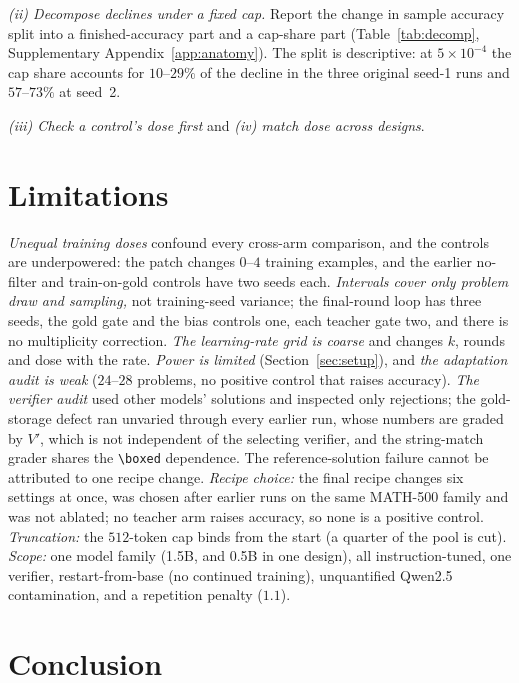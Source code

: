 \documentclass[runningheads]{llncs}
\begin{document}
\emph{(ii) Decompose declines under a fixed cap.} Report the change in sample
accuracy split into a finished-accuracy part and a cap-share part
(Table~\ref{tab:decomp}, Supplementary Appendix~\ref{app:anatomy}). The split is descriptive: at $5\times10^{-4}$ the cap share accounts for
$10$--$29\%$ of the decline in the three original seed-1 runs and $57$--$73\%$
at seed~2.

\emph{(iii) Check a control's dose first} and \emph{(iv) match dose across designs}.

\section{Limitations}
\label{sec:limitations}

\emph{Unequal training doses} confound every cross-arm comparison, and the
controls are underpowered: the patch changes $0$--$4$ training examples, and
the earlier no-filter and train-on-gold controls have two seeds each. \emph{Intervals
cover only problem draw and sampling,} not training-seed variance; the final-round loop has three seeds, the
gold gate and the bias controls one, each teacher gate two, and there is no multiplicity correction. \emph{The
learning-rate grid is coarse} and changes $k$, rounds and dose with the rate. \emph{Power is limited} (Section~\ref{sec:setup}), and \emph{the adaptation audit is weak} ($24$--$28$
problems, no positive control that raises accuracy).
 \emph{The verifier audit} used other models' solutions and inspected only
rejections; the gold-storage defect ran unvaried through every earlier run, whose numbers are graded
by $V'$, which is not independent of the selecting verifier, and the string-match grader shares the \verb|\boxed| dependence. The reference-solution failure cannot be attributed to one recipe change. \emph{Recipe choice:} the final recipe changes six settings at once, was chosen after earlier runs on the same MATH-500 family and was not ablated; no teacher arm raises accuracy, so none is a positive control. \emph{Truncation:} the $512$-token cap binds from
the start (a quarter of the pool is cut). \emph{Scope:}
one model family (1.5B, and 0.5B in one design), all instruction-tuned, one verifier, restart-from-base (no continued
training), unquantified Qwen2.5 contamination, and a repetition penalty ($1.1$).

\section{Conclusion}
\label{sec:conclusion}
\end{document}

